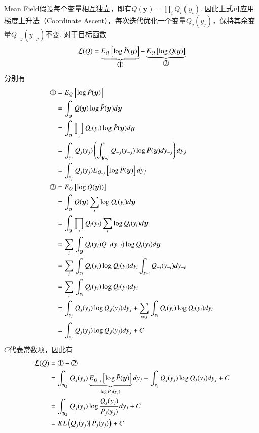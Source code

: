 Mean Field假设每个变量相互独立，即有$Q(\boldsymbol{y})=\prod_i{Q_i(y_i)}$.
因此上式可应用梯度上升法（Coordinate Ascent），每次迭代优化一个变量$Q_j(y_j)$，保持其余变量$Q_{-j}(y_{-j})$不变.
对于目标函数
\begin{equation}
  \mathcal{L}(Q)=\underbrace{E_{Q}\left[\log \tilde{P}(\boldsymbol{y})\right]}_{\tcircle{1}}-\underbrace{E_{Q}\left[\log Q(\boldsymbol{y})\right]}_{\tcircle{2}}
\end{equation}
分别有
\begin{equation}
  \begin{split}
    \tcircle{1}&=E_{Q}\left[\log \tilde{P}(\boldsymbol{y})\right]\\
    &=\int_{\boldsymbol{y}}Q(\boldsymbol{y}) \log \tilde{P}(\boldsymbol{y})d\boldsymbol{y}\\
    &=\int_{\boldsymbol{y}}\prod_i{Q_i(y_i)} \log \tilde{P}(\boldsymbol{y})d\boldsymbol{y}\\
    &=\int_{y_j}Q_j(y_j)\left(\int_{\boldsymbol{y_{-j}}}Q_{-j}(y_{-j})\log \tilde{P}(\boldsymbol{y}) dy_{-j}\right) dy_j\\
    &=\int_{y_j}Q_j(y_j)E_{Q_{-j}}\left[\log \tilde{P}(\boldsymbol{y}) \right] dy_j\\
    \tcircle{2}&=E_{Q}\left[\log Q(\boldsymbol{y}))\right]\\
    &=\int_{\boldsymbol{y}}Q(\boldsymbol{y}) \sum_i\log Q_i(y_i) d\boldsymbol{y}\\
    &=\int_{\boldsymbol{y}}\prod_i{Q_i(y_i)} \sum_i\log Q_i(y_i) d\boldsymbol{y}\\
    &=\sum_i\int_{\boldsymbol{y}}Q_i(y_i)Q_{-i}(y_{-i})\log Q_i(y_i) d\boldsymbol{y}\\
    &=\sum_i\int_{y_i}Q_i(y_i)\log Q_i(y_i) dy_i\int_{y_{-i}} {Q_{-i}(y_{-i})}dy_{-i}\\
    &=\sum_i\int_{y_i}Q_i(y_i)\log Q_i(y_i) dy_i\\
    &=\int_{y_j}Q_j(y_j)\log Q_j(y_j) dy_j + \sum_{i\neq j}\int_{y_i}Q_i(y_i)\log Q_i(y_i) dy_i  \\
    &=\int_{y_j}Q_j(y_j)\log Q_j(y_j) dy_j + C
  \end{split}
\end{equation}
$C$代表常数项，因此有
\begin{equation}
  \begin{split}
    \mathcal{L}(Q)&=\tcircle{1}-\tcircle{2}\\
    &=\int_{\boldsymbol{y_j}}Q_j(y_j)\underbrace{E_{Q_{-j}}\left[\log \tilde{P}(\boldsymbol{y}) \right]}_{\log \dot{P}_j(y_j)} dy_j-\int_{y_j}Q_j(y_j)\log Q_j(y_j) dy_j +C\\
    &=\int_{\boldsymbol{y_j}}Q_j(y_j)\log\frac{Q_j(y_j)}{\dot{P}_j(y_j)} dy_j +C\\
    &=KL\left(Q_j(y_j)\|\dot{P}_j(y_j)\right)+C
  \end{split}
\end{equation}
